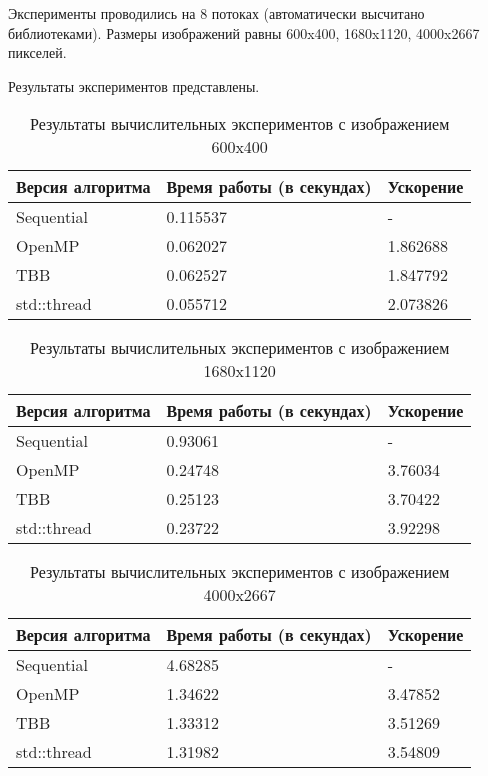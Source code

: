 \documentclass{report}
\begin{document}
\par Эксперименты проводились на 8 потоках (автоматически высчитано библиотеками). Размеры изображений равны 600x400, 1680x1120, 4000x2667 пикселей.

\par Результаты экспериментов представлены.
\begin{table}[!h]
\caption{Результаты вычислительных экспериментов с изображением 600x400}
\centering
\begin{tabular}{| p{5cm} | p{5cm} | p{5cm} |}
\hline
Версия алгоритма & Время работы (в секундах) & Ускорение  \\[5pt]
\hline
Sequential      & 0.115537       & -         \\
OpenMP        & 0.062027        & 1.862688          \\
TBB       & 0.062527       & 1.847792         \\
std::thread        & 0.055712        & 2.073826          \\
\hline
\end{tabular}
\end{table}

\begin{table}[!h]
\caption{Результаты вычислительных экспериментов с изображением 1680x1120}
\centering
\begin{tabular}{| p{5cm} | p{5cm} | p{5cm} |}
\hline
Версия алгоритма & Время работы (в секундах) & Ускорение  \\[5pt]
\hline
Sequential        & 0.93061        & -         \\
OpenMP        & 0.24748        & 3.76034          \\
TBB       & 0.25123        & 3.70422         \\
std::thread        & 0.23722        & 3.92298           \\
\hline
\end{tabular}
\end{table}

\begin{table}[!h]
\caption{Результаты вычислительных экспериментов с изображением 4000x2667}
\centering
\begin{tabular}{| p{5cm} | p{5cm} | p{5cm} |}
\hline
Версия алгоритма & Время работы (в секундах) & Ускорение  \\[5pt]
\hline
Sequential        & 4.68285        & -         \\
OpenMP        & 1.34622        & 3.47852          \\
TBB       & 1.33312        & 3.51269        \\
std::thread        & 1.31982        & 3.54809           \\
\hline
\end{tabular}
\end{table}
\end{document}
